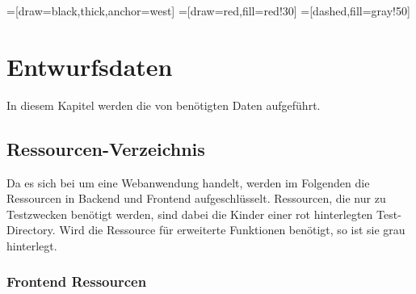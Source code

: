 =[draw=black,thick,anchor=west]
=[draw=red,fill=red!30]
=[dashed,fill=gray!50]

\section{Entwurfsdaten}
In diesem Kapitel werden die von \softwarename benötigten Daten aufgeführt.

\subsection{Ressourcen-Verzeichnis}
Da es sich bei \softwarename um eine Webanwendung handelt, werden im Folgenden die Ressourcen in Backend und Frontend aufgeschlüsselt.
Ressourcen, die nur zu Testzwecken benötigt werden, sind dabei die Kinder einer rot hinterlegten Test-Directory. Wird die Ressource für erweiterte Funktionen benötigt, so ist sie grau hinterlegt.

\subsubsection{Frontend Ressourcen}

